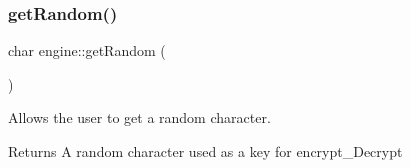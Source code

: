 \subsubsection{\texorpdfstring{get\+Random()}{getRandom()}}
{\footnotesize\ttfamily char engine\+::get\+Random (\begin{DoxyParamCaption}{ }\end{DoxyParamCaption})}



Allows the user to get a random character. 

\begin{DoxyReturn}{Returns}
A random character used as a key for encrypt\+\_\+\+Decrypt 
\end{DoxyReturn}
